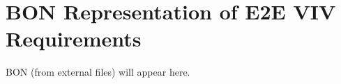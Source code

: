 \chapter{BON Representation of E2E VIV Requirements}
\label{appendix:bon_requirements}

BON (from external files) will appear here.
